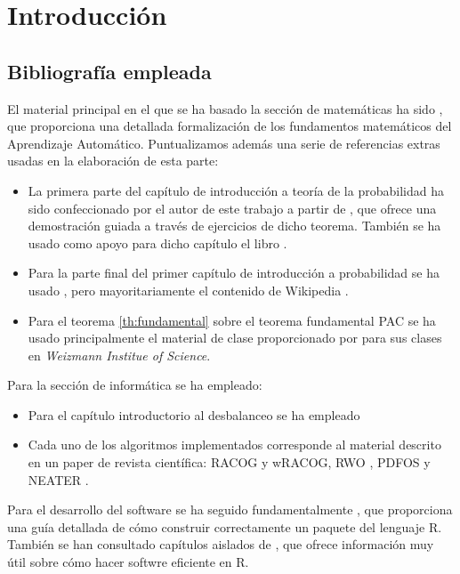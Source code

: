 \chapter*{Introducción}

  \section*{Bibliografía empleada}
  El material principal en el que se ha basado la sección de matemáticas ha sido \citeauthor{shalev}, 
  que proporciona una detallada formalización de los fundamentos matemáticos del Aprendizaje Automático. Puntualizamos además
  una serie de referencias extras usadas en la elaboración de esta parte:
  
  \begin{itemize} 
   \item La primera parte del capítulo de introducción a teoría de la probabilidad ha sido confeccionado por el autor de 
   este trabajo a partir de \citet{caratheodory}, que ofrece una demostración guiada a través de ejercicios de dicho teorema. 
   También se ha usado como apoyo para dicho capítulo el libro \citeauthor{loeve}. 
   \item Para la parte final del primer capítulo de introducción a probabilidad se ha usado \citeauthor{shalev}, pero
   mayoritariamente el contenido de Wikipedia \citep{wiki:markov, wiki:hoeff_lemma, wiki:hoeffding}.
   \item Para el teorema \ref{th:fundamental} sobre el teorema fundamental PAC se ha usado principalmente el material de clase
   proporcionado por \citeauthor{slfetaya} para sus clases en \textit{Weizmann Institue of Science}.
  \end{itemize}
   
   Para la sección de informática se ha empleado:
   
  \begin{itemize}
   \item Para el capítulo introductorio al desbalanceo se ha empleado \citep{he2009} 
   \item Cada uno de los algoritmos implementados corresponde al material descrito en un paper de revista científica: 
   RACOG y wRACOG\citep{das2015}, RWO \citep{zhang2014}, PDFOS \citep{gao2014} y NEATER \citep{almogahed2014}.
  \end{itemize}

   Para el desarrollo del software se ha seguido fundamentalmente \citep*{rhadleypkg}, que proporciona una guía detallada de
   cómo construir correctamente un paquete del lenguaje R. También se han consultado capítulos aislados de \citep*{rgillespie},
   que ofrece información muy útil sobre cómo hacer softwre eficiente en R.